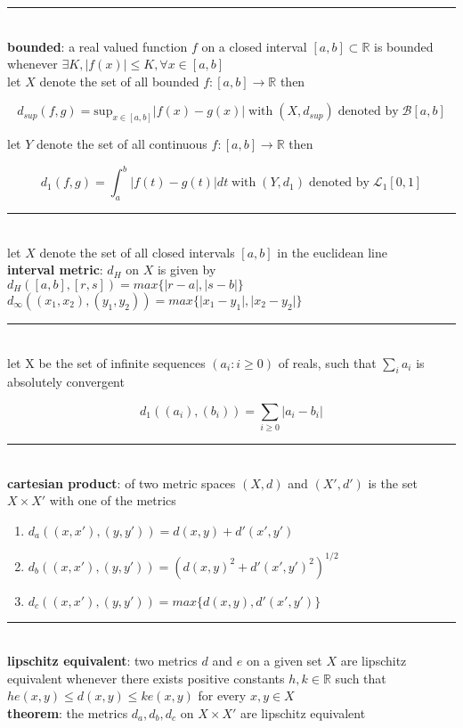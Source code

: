 \documentclass[a4paper]{article}
\newcommand*\abs[1]{\vert #1 \vert}
\newcommand*\linesep[0]{\noindent\rule{\textwidth}{0.5pt}\\}
\begin{document}
\begin{framed}
	\linesep
	\noindent
	\textbf{bounded}: a real valued function $f$ on a closed interval $[a, b] \subset \mathbb{R}$ is bounded whenever $\exists K, \abs{f(x)} \leq K, \forall x \in [a, b]$\\
	
	\noindent
	let $X$ denote the set of all bounded $f: [a, b] \rightarrow \mathbb{R}$ then
	
	$$d_{sup}(f, g) = \text{sup}_{x \in [a, b]} \abs{f(x) - g(x)} \; \text{with} \; (X, d_{sup}) \; \text{denoted by} \; \mathcal{B}[a, b]$$
	
	\newpage
	\noindent
	let $Y$ denote the set of all continuous $f: [a, b] \rightarrow \mathbb{R}$ then
	
	$$d_1(f, g) = \int_a^b \abs{f(t) - g(t)} dt \; \text{with} \; (Y, d_1) \; \text{denoted by} \; \mathcal{L}_1[0, 1]$$
	
	\linesep
	\noindent
	let $X$ denote the set of all closed intervals $[a, b]$ in the euclidean line\\
	
	\noindent
	\textbf{interval metric}: $d_H$ on $X$ is given by $d_H([a, b], [r, s]) = max\{\abs{r-a}, \abs{s-b}\}$\\
	
	\noindent
	$d_\infty((x_1, x_2), (y_1, y_2)) = max\{\abs{x_1 - y_1}, \abs{x_2 - y_2}\}$
	
	\linesep
	let X be the set of infinite sequences $(a_i : i \geq 0)$ of reals, such that $\sum_i a_i$ is absolutely convergent
	
	$$d_1((a_i), (b_i)) = \sum_{i \geq 0} \abs{a_i - b_i}$$
	
	\linesep
	\textbf{cartesian product}: of two metric spaces $(X, d)$ and $(X', d')$ is the set $X \times X'$ with one of the metrics
	\begin{enumerate}
		\item $d_a((x, x'), (y, y')) = d(x, y) + d'(x', y')$
		\item $d_b((x, x'), (y, y')) = (d(x, y)^2 + d'(x', y')^2)^{1/2}$
		\item $d_c((x, x'), (y, y')) = max\{d(x, y), d'(x', y')\}$
	\end{enumerate}
	
	\linesep
	\noindent
	\textbf{lipschitz equivalent}: two metrics $d$ and $e$ on a given set $X$ are lipschitz equivalent whenever there exists positive constants $h, k \in \mathbb{R}$ such that $he(x, y) \leq d(x, y) \leq ke(x, y)$ for every $x, y \in X$\\
	
	\noindent
	\textbf{theorem}: the metrics $d_a, d_b, d_c$ on $X \times X'$ are lipschitz equivalent
\end{framed}
\end{document}
